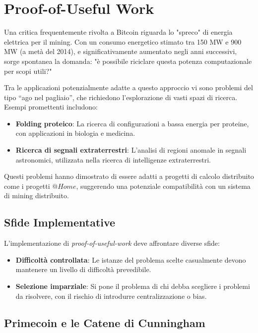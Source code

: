 \section{Proof-of-Useful Work}
Una critica frequentemente rivolta a Bitcoin riguarda lo "spreco" di energia  elettrica per il mining. Con un consumo energetico stimato tra 150 MW e 900 MW (a metà del 2014), e significativamente aumentato negli anni successivi, sorge spontanea la domanda: "è possibile riciclare questa potenza computazionale per scopi utili?"

Tra le applicazioni potenzialmente adatte a questo approccio vi sono problemi del tipo ``ago nel pagliaio'', che richiedono l'esplorazione di vasti spazi di ricerca. Esempi promettenti includono:

\begin{itemize}
    \item \textbf{Folding proteico}: La ricerca di configurazioni a bassa energia per proteine, con applicazioni in biologia e medicina.
    \item \textbf{Ricerca di segnali extraterrestri}: L'analisi di regioni anomale in segnali astronomici, utilizzata nella ricerca di intelligenze extraterrestri.
\end{itemize}

Questi problemi hanno dimostrato di essere adatti a progetti di calcolo distribuito come i progetti $@Home$, suggerendo una potenziale compatibilità con un sistema di mining distribuito.

\subsection*{Sfide Implementative}
L'implementazione di \textit{proof-of-useful-work} deve affrontare diverse sfide:

\begin{itemize}
    \item \textbf{Difficoltà controllata}: Le istanze del problema scelte casualmente devono mantenere un livello di difficoltà prevedibile.
    \item \textbf{Selezione imparziale}: Si pone il problema di chi debba scegliere i problemi da risolvere, con il rischio di introdurre centralizzazione o bias.
\end{itemize}
\subsection{Primecoin e le Catene di Cunningham}

